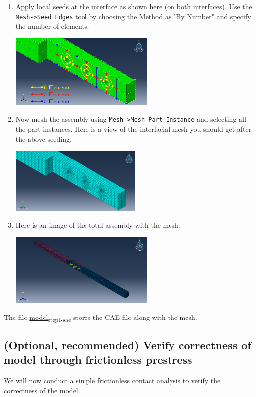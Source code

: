 \documentclass[11pt]{article}
\begin{document}
\begin{enumerate}
\begin{center}
\end{center}
\item Apply local seeds at the interface as shown here (on both interfaces).
Use the \texttt{Mesh->Seed Edges} tool by choosing the Method as "By Number" and specify the number of elements.
\begin{center}
\includegraphics[width=0.55\textwidth]{./figs/lmeshseeds.png}
\end{center}
\item Now mesh the assembly using \texttt{Mesh->Mesh Part Instance} and selecting all the part instances.
Here is a view of the interfacial mesh you should get after the above seeding.
\begin{center}
\includegraphics[width=0.5\textwidth]{./figs/mesh.png}
\end{center}
\item Here is an image of the total assembly with the mesh.
\begin{center}
\includegraphics[width=0.55\textwidth]{./figs/fullmesh.png}
\end{center}
\end{enumerate}

The file \href{https://github.com/Nidish96/Abaqus4Joints/blob/main/assets/assembly/model\_step1.cae}{model\textsubscript{step1.cae}} stores the CAE-file along with the mesh.
\subsection{(Optional, recommended) Verify correctness of model through frictionless prestress}
\label{sec:org0eb9ca5}
We will now conduct a simple frictionless contact analysis to verify the correctness of the model.
\end{document}
